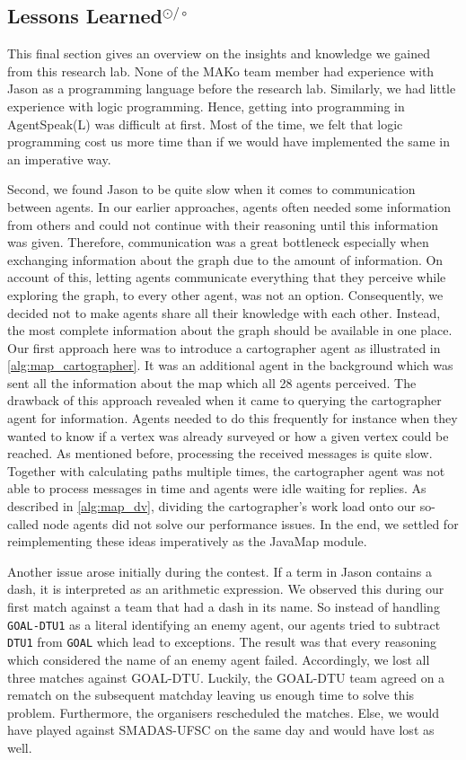 \subsection[Lessons Learned]{Lessons Learned$^{\odot/\circ}$}
This final section gives an overview on the insights and knowledge we gained from this research lab.
None of the MAKo team member had experience with Jason as a programming language before the research lab.
Similarly, we had little experience with logic programming.
Hence, getting into programming in AgentSpeak(L) was difficult at first.
Most of the time, we felt that logic programming cost us more time than if we would have implemented the same in an imperative way.

Second, we found Jason to be quite slow when it comes to communication between agents.
In our earlier approaches, agents often needed some information from others and could not continue with their reasoning until this information was given.
Therefore, communication was a great bottleneck especially when exchanging information about the graph due to the amount of information.
On account of this, letting agents communicate everything that they perceive while exploring the graph, to every other agent, was not an option.
Consequently, we decided not to make agents share all their knowledge with each other.
Instead, the most complete information about the graph should be available in one place.
Our first approach here was to introduce a cartographer agent as illustrated in \autoref{alg:map_cartographer}.
It was an additional agent in the background which was sent all the information about the map which all 28 agents perceived.
The drawback of this approach revealed when it came to querying the cartographer agent for information.
Agents needed to do this frequently for instance when they wanted to know if a vertex was already surveyed or how a given vertex could be reached.
As mentioned before, processing the received messages is quite slow.
Together with calculating paths multiple times, the cartographer agent was not able to process messages in time and agents were idle waiting for replies.
As described in \autoref{alg:map_dv}, dividing the cartographer's work load onto our so-called node agents did not solve our performance issues.
In the end, we settled for reimplementing these ideas imperatively as the JavaMap module.

Another issue arose initially during the contest.
If a term in Jason contains a dash, it is interpreted as an arithmetic expression.
We observed this during our first match against a team that had a dash in its name.
So instead of handling \texttt{GOAL-DTU1} as a literal identifying an enemy agent, our agents tried to subtract \texttt{DTU1} from \texttt{GOAL} which lead to exceptions.
The result was that every reasoning which considered the name of an enemy agent failed.
Accordingly, we lost all three matches against GOAL-DTU.
Luckily, the GOAL-DTU team agreed on a rematch on the subsequent matchday leaving us enough time to solve this problem.
Furthermore, the organisers rescheduled the matches.
Else, we would have played against SMADAS-UFSC on the same day and would have lost as well.

